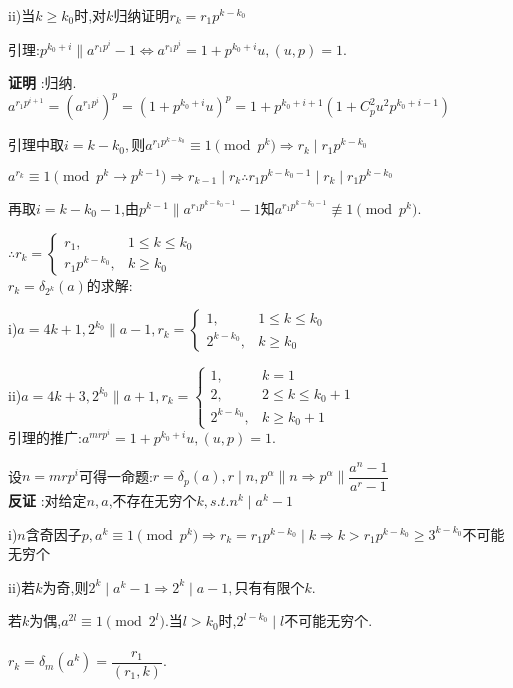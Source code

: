 ii)当$ k\ge k_0$时,对$k $归纳证明$ r_k=r_1 p^{k-k_0}$

引理:$ p^{k_0+i}\parallel a^{r_1p^i}-1\Leftrightarrow a^{r_1p^i}=1+p^{k_0+i}u,(u,p)=1$.

{\bf 证明 }:归纳.
$ a^{r_1p^{i+1}}=(a^{r_1p^i})^p=(1+p^{k_0+i}u)^p=1+p^{k_0+i+1}(1+C_p^2u^2p^{k_0+i-1})$

引理中取$ i=k-k_0,$则$ a^{r_1p^{k-k_0}}\equiv 1 \pmod{p^k}\Rightarrow r_k \mid r_1p^{k-k_0}$

$ a^{r_k}\equiv 1\pmod{p^k \rightarrow p^{k-1}}\Rightarrow r_{k-1}\mid r_k \therefore r_1p^{k-k_0-1}\mid r_k \mid r_1p^{k-k_0}$

再取$ i=k-k_0-1$,由$ p^{k-1}\parallel a^{r_1p^{k-k_0-1}}-1$知$ a^{r_1p^{k-k_0-1}}\not \equiv 1 \pmod{p^k}.$


$  \therefore r_k=
\begin{cases}
r_1, & 1\le k \le k_0 \\
r_1p^{k-k_0}, & k\ge k_0 
\end{cases} 
$
\\

$ r_k=\delta_{2^k}(a)$的求解:

i)$ a=4k+1,2^{k_0}\parallel a-1,r_k=
\begin{cases}
1,& 1\le k \le k_0 \\ 
2^{k-k_0},& k\ge k_0 
\end{cases}
$ 

ii)$ a=4k+3,2^{k_0}\parallel a+1,r_k=
\begin{cases} 
1,& k=1 \\ 
2,& 2\le k\le k_0+1 \\ 
2^{k-k_0},& k\ge k_0+1 
\end{cases}$
\\

引理的推广:$ a^{mrp^i}=1+p^{k_0+i}u,(u,p)=1.$

设$ n=mrp^i$可得一命题:$ r=\delta_p(a),r\mid n,p^{\alpha}\parallel n\Rightarrow p^{\alpha}\parallel \dfrac{a^n-1}{a^r-1} $
\\

{\bf 反证 }:对给定$ n,a$,不存在无穷个$ k,s.t.n^k\mid a^k-1$

i)$ n$含奇因子$ p,a^k\equiv 1 \pmod {p^k}\Rightarrow r_k=r_1p^{k-k_0}\mid k\Rightarrow k>r_1p^{k-k_0}\ge 3^{k-k_0}$不可能无穷个

ii)若$ k$为奇,则$ 2^k\mid a^k-1\Rightarrow 2^k\mid a-1,$只有有限个$ k$.

若$ k$为偶,$ a^{2l}\equiv 1 \pmod{2^l}.$当$ l>k_0$时,$ 2^{l-k_0}\mid l$不可能无穷个.
\\
\\
$ r_k=\delta_m(a^k)=\dfrac{r_1}{(r_1,k)}$.

